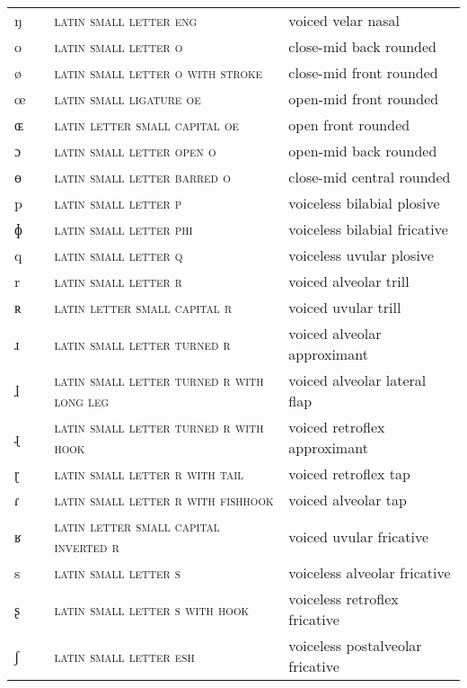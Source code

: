 \begin{center}
\begin{xtabular}{ l L{1.2cm} L{5.4cm} L{4.2cm} }
ŋ &  & \textsc{latin small letter eng} & voiced velar nasal \\ 
o &  & \textsc{latin small letter o} & close-mid back rounded \\ 
ø &  & \textsc{latin small letter o with stroke} & close-mid front rounded \\ 
œ &  & \textsc{latin small ligature oe} & open-mid front rounded \\ 
ɶ &  & \textsc{latin letter small capital oe} & open front rounded \\ 
ɔ &  & \textsc{latin small letter open o} & open-mid back rounded \\ 
ɵ &  & \textsc{latin small letter barred o} & close-mid central rounded \\ 
p &  & \textsc{latin small letter p} & voiceless bilabial plosive \\ 
ɸ &  & \textsc{latin small letter phi} & voiceless bilabial fricative \\ 
q &  & \textsc{latin small letter q} & voiceless uvular plosive \\ 
r &  & \textsc{latin small letter r} & voiced alveolar trill \\ 
ʀ &  & \textsc{latin letter small capital r} & voiced uvular trill \\ 
ɹ &  & \textsc{latin small letter turned r} & voiced alveolar approximant \\ 
ɺ &  & \textsc{latin small letter turned r with long leg} & voiced alveolar lateral flap \\ 
ɻ &  & \textsc{latin small letter turned r with hook} & voiced retroflex approximant \\ 
ɽ &  & \textsc{latin small letter r with tail} & voiced retroflex tap \\ 
ɾ &  & \textsc{latin small letter r with fishhook} & voiced alveolar tap \\ 
ʁ &  & \textsc{latin letter small capital inverted r} & voiced uvular fricative \\ 
s &  & \textsc{latin small letter s} & voiceless alveolar fricative \\ 
ʂ &  & \textsc{latin small letter s with hook} & voiceless retroflex fricative \\ 
ʃ &  & \textsc{latin small letter esh} & voiceless postalveolar fricative \\ 

\end{xtabular}
\end{center}
